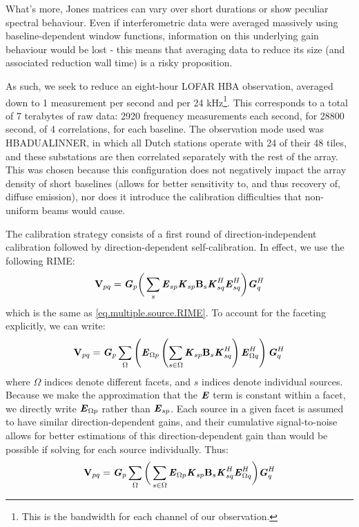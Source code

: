 \pg
What's more, Jones matrices can vary over short durations or show peculiar spectral behaviour. Even if interferometric data were averaged massively using baseline-dependent window functions, information on this underlying gain behaviour would be lost - this means that averaging data to reduce its size (and associated reduction wall time) is a risky proposition.

\pg
As such, we seek to reduce an eight-hour LOFAR HBA observation, averaged down to 1 measurement per second and per 24 kHz\footnote{This is the bandwidth for each channel of our observation.}. This corresponds to a total of 7 terabytes of raw data: 2920 frequency measurements each second, for 28800 second, of 4 correlations, for each baseline. The observation mode used was HBA\textunderscore DUAL\textunderscore INNER, in which all Dutch stations operate with 24 of their 48 tiles, and these substations are then correlated separately with the rest of the array. This was chosen because this configuration does not negatively impact the array density of short baselines (allows for better sensitivity to, and thus recovery of, diffuse emission), nor does it introduce the calibration difficulties that non-uniform beams would cause.

\pg
The calibration strategy consists of a first round of direction-independent calibration followed by direction-dependent self-calibration. In effect, we use the following RIME:
\begin{equation}
\textbf{V}_{pq} = \textbf{\emph{G}}_p \bigg( \sum_s \textbf{\emph{E}}_{sp} \textbf{\emph{K}}_{sp} \textbf{B}_{s} \textbf{\emph{K}}_{sq}^H \textbf{\emph{E}}_{sq}^H \bigg) \textbf{\emph{G}}_q^H
\end{equation}
which is the same as \cref{eq.multiple.source.RIME}. To account for the faceting explicitly, we can write:
\begin{equation}
\textbf{V}_{pq} = \textbf{\emph{G}}_p \sum_{\Omega}\left( \textbf{\emph{E}}_{\Omega p} \left( \sum_{s\in\Omega}\textbf{\emph{K}}_{sp} \textbf{B}_{s} \textbf{\emph{K}}_{sq}^H\right) \textbf{\emph{E}}_{\Omega q}^H \right) \textbf{\emph{G}}_q^H
\end{equation}
where $\Omega$ indices denote different facets, and $s$ indices denote individual sources. Because we make the approximation that the $\textbf{\emph{E}}$ term is constant within a facet, we directly write $\textbf{\emph{E}}_{\Omega p}$ rather than $\textbf{\emph{E}}_{sp}$. Each source in a given facet is assumed to have similar direction-dependent gains, and their cumulative signal-to-noise allows for better estimations of this direction-dependent gain than would be possible if solving for each source individually. 
Thus:
\begin{equation}
\textbf{V}_{pq} = \textbf{\emph{G}}_p \sum_{\Omega}\bigg( \sum_{s\in\Omega} \textbf{\emph{E}}_{\Omega p} \textbf{\emph{K}}_{sp} \textbf{B}_{s} \textbf{\emph{K}}_{sq}^H \textbf{\emph{E}}_{\Omega q}^H \bigg) \textbf{\emph{G}}_q^H
\end{equation}

